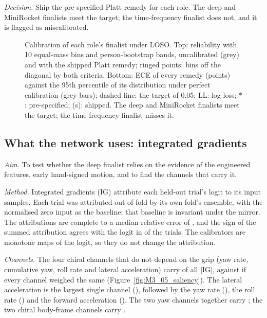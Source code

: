 \emph{Decision.} Ship the pre-specified Platt remedy for each role. The deep and MiniRocket finalists meet the target; the time-frequency finalist does not, and it is flagged as miscalibrated.

\begin{figure}[tbp]
  \centering
  \caption{Calibration of each role's finalist under LOSO. Top: reliability with 10 equal-mass bins and person-bootstrap bands, uncalibrated (grey) and with the shipped Platt remedy; ringed points: bins off the diagonal by both criteria. Bottom: ECE of every remedy (points) against the 95th percentile of its distribution under perfect calibration (grey bars); dashed line: the target of 0.05; LL: log loss; $*$: pre-specified; (s): shipped. The deep and MiniRocket finalists meet the target; the time-frequency finalist misses it.}
  \label{fig:M3_04_calibration}\label{fig:app:m3-calibration}
\end{figure}



\subsection{What the network uses: integrated gradients}\label{app:m3:saliency}

\emph{Aim.} To test whether the deep finalist relies on the evidence of the engineered features, early hand-signed motion, and to find the channels that carry it.

\emph{Method.} Integrated gradients (IG) attribute each held-out trial's logit to its input samples.
Each trial was attributed out of fold by its own fold's ensemble, with the normalised zero input as the baseline; that baseline is invariant under the mirror.
The attributions are complete to a median relative error of , and the sign of the summed attribution agrees with the logit in  of the trials.
The calibrators are monotone maps of the logit, so they do not change the attribution.

\emph{Channels.} The four chiral channels that do not depend on the grip (yaw rate, cumulative yaw, roll rate and lateral acceleration) carry  of all $|\mathrm{IG}|$, against  if every channel weighed the same (Figure~\ref{fig:M3_05_saliency}).
The lateral acceleration is the largest single channel (), followed by the yaw rate (), the roll rate () and the forward acceleration ().
The two yaw channels together carry ; the two chiral body-frame channels carry .

